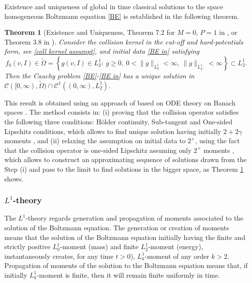 \documentclass[11pt,a4paper]{amsart}
\newcommand{\g}{\gamma}
\newtheorem{theorem}{Theorem}
\begin{document}
Existence and uni\-que\-ness of global in time  classical solutions to the space homogeneous Boltzmann equation \eqref{BE} is established in the following theorem.
\begin{theorem}[Existence and Uniqueness,  Theorem 7.2 for $M=0$, $P=1$ in \cite{MC-Alonso-Gamba}, or Theorem 3.8 in \cite{MC-Alonso-Pesaro}]\label{Th well poss}
	Consider the collision kernel in the cut-off and hard-potentials form, see \eqref{coll kernel assumpt}, and initial data \eqref{BE in} satisfying 
	\begin{equation}\label{Omega}
		f_0(v,I) \in	\tilde{\Omega} = \left\{ g(v,I) \in L^1_2: \ g \geq 0, \ 0< \| g \|_{L^1_{0}}  < \infty, \
		\| g \|_{L^1_{2^+}}   < \infty \right\} \subset L^1_2.
	\end{equation}
	Then the Cauchy problem \eqref{BE}-\eqref{BE in} has a unique solution in $\mathcal{C}([0,\infty), \tilde{\Omega})  \cap \mathcal{C}^1((0,\infty), L^1_2)$.
\end{theorem}
This  result is obtained using   an approach of \cite{Alonso-cooling} based on  ODE theory on Banach spaces \cite{Martin-ODE}. The method consists in:  {(i)} proving that the collision operator satisfies the following three conditions: H\"older continuity,  Sub-tangent and One-sided Lipschitz conditions, which allows to find unique solution having  initially $2+2\g$ moments \cite{MPC-IG-poly}, and  {(ii)} relaxing the assumption on initial data to $2^+$, using the fact that  the collision operator is one-sided Lipschitz assuming only $2^+$  moments \cite{MC-Alonso-Gamba}, which allows to construct an approximating sequence of solutions drawn from the Step  {(i)} and pass to the limit to find solutions in the bigger space, as Theorem \ref{Th well poss} shows.

\subsubsection{$L^1$-theory} The $L^1$-theory  regards ge\-ne\-ration and propagation of moments associated to the solution of the Boltzmann equation. The ge\-ne\-ration or creation of moments  means that the solution of the Boltzmann equation initially  having the finite and strictly positive $L^1_0$-moment (mass) and finite  $L^1_2$-moment   (energy), instantaneously creates, for any time $t>0$), $L^1_k$-moment of any order $k>2$. Propagation of moments of the solution to the Boltzmann equation means that, if initially $L^1_k$-moment is finite, then it will remain finite uniformly in time.  
\end{document}
